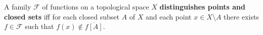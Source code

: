 A family $\mathcal{F}$ of functions on a topological space $X$ \textbf{distinguishes points and closed sets} iff for each closed subset $A$ of $X$ and each point $x \in X \setminus A$ there exists $f \in \mathcal{F}$ such that $f(x) \notin \overline{f[A]}$.
